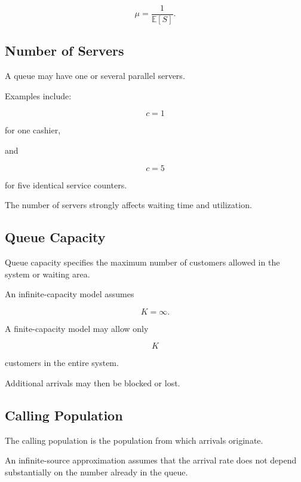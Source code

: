 \[
\boxed{
\mu
=
\frac{1}{\mathbb{E}[S]}.
}
\]

\subsection{Number of Servers}
\label{subsec:queue-number-servers}

A queue may have one or several parallel servers.

Examples include:

\[
\boxed{
c=1
}
\]

for one cashier,

and

\[
\boxed{
c=5
}
\]

for five identical service counters.

The number of servers strongly affects waiting time and utilization.

\subsection{Queue Capacity}
\label{subsec:queue-capacity}

Queue capacity specifies the maximum number of customers allowed in the
system or waiting area.

An infinite-capacity model assumes

\[
\boxed{
K=\infty.
}
\]

A finite-capacity model may allow only

\[
\boxed{
K
}
\]

customers in the entire system.

Additional arrivals may then be blocked or lost.

\subsection{Calling Population}
\label{subsec:calling-population}

The calling population is the population from which arrivals originate.

An infinite-source approximation assumes that the arrival rate does not
depend substantially on the number already in the queue.

